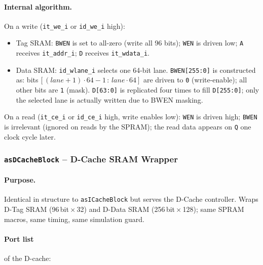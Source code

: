 \paragraph{Internal algorithm.}
On a write (\texttt{it\_we\_i} or \texttt{id\_we\_i} high):
\begin{itemize}
  \item Tag SRAM: \texttt{BWEN} is set to all-zero (write all 96 bits);
    \texttt{WEN} is driven low; \texttt{A} receives \texttt{it\_addr\_i};
    \texttt{D} receives \texttt{it\_wdata\_i}.
  \item Data SRAM: \texttt{id\_wlane\_i} selects one 64-bit lane.
    \texttt{BWEN[255:0]} is constructed as: bits\,$[(lane+1)\cdot64-1\,:\,lane\cdot64]$
    are driven to \texttt{0} (write-enable); all other bits are \texttt{1}
    (mask).
    \texttt{D[63:0]} is replicated four times to fill \texttt{D[255:0]};
    only the selected lane is actually written due to BWEN masking.
\end{itemize}
On a read (\texttt{it\_ce\_i} or \texttt{id\_ce\_i} high, write enables
low): \texttt{WEN} is driven high; \texttt{BWEN} is irrelevant (ignored
on reads by the SPRAM); the read data appears on \texttt{Q} one clock
cycle later.

\subsubsection{\texttt{asDCacheBlock} -- D-Cache SRAM Wrapper}
\label{subsubsec:asDCacheBlock}

\paragraph{Purpose.}
Identical in structure to \texttt{asICacheBlock} but serves the D-Cache
controller.
Wraps D-Tag SRAM (96\,bit\,$\times$\,32) and D-Data SRAM
(256\,bit\,$\times$\,128); same SPRAM macros, same timing, same
simulation guard.

\paragraph{Port list} of the D-cache:

